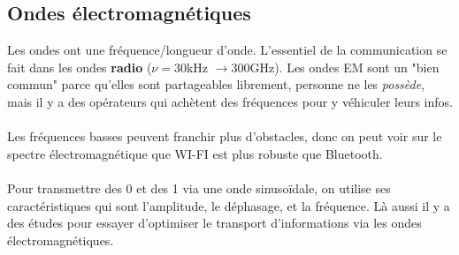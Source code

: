 \documentclass[12pt,a4paper]{report}
\begin{document}
\subsection{Ondes électromagnétiques}
Les ondes ont une fréquence/longueur d'onde. L'essentiel de la communication se fait dans les ondes \textbf{radio} ($\nu = 30$kHz $\rightarrow 300$GHz). Les ondes EM sont un "bien commun" parce qu'elles sont partageables librement, personne ne les \textit{possède}, mais il y a des opérateurs qui achètent des fréquences pour y véhiculer leurs infos.\\
\\
Les fréquences basses peuvent franchir plus d'obstacles, donc on peut voir sur le spectre électromagnétique que WI-FI est plus robuste que Bluetooth.\\
\\
Pour transmettre des 0 et des 1 via une onde sinusoïdale, on utilise ses caractéristiques qui sont l'amplitude, le déphasage, et la fréquence. Là aussi il y a des études pour essayer d'optimiser le transport d'informations via les ondes électromagnétiques.
\end{document}
